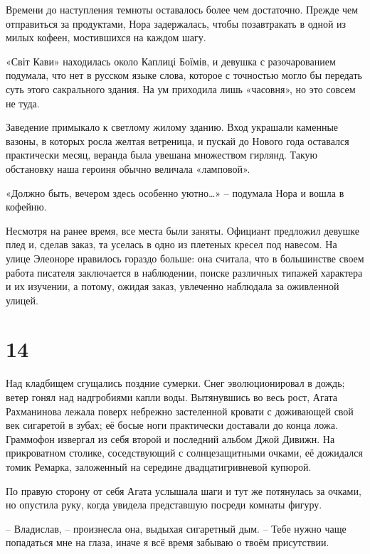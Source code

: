\documentclass[
  a5paperpaper,
  DIV=11,
  numbers=noendperiod]{scrreprt}
\begin{document}
Времени до наступления темноты оставалось более чем достаточно. Прежде
чем отправиться за продуктами, Нора задержалась, чтобы позавтракать в
одной из милых кофеен, мостившихся на каждом шагу.

«Світ Кави» находилась около Каплиці Боїмів, и девушка с разочарованием
подумала, что нет в русском языке слова, которое с точностью могло бы
передать суть этого сакрального здания. На ум приходила лишь «часовня»,
но это совсем не туда.

Заведение примыкало к светлому жилому зданию. Вход украшали каменные
вазоны, в которых росла желтая ветреница, и пускай до Нового года
оставался практически месяц, веранда была увешана множеством гирлянд.
Такую обстановку наша героиня обычно величала «ламповой».

«Должно быть, вечером здесь особенно уютно\ldots» -- подумала Нора и
вошла в кофейню.

Несмотря на ранее время, все места были заняты. Официант предложил
девушке плед и, сделав заказ, та уселась в одно из плетеных кресел под
навесом. На улице Элеоноре нравилось гораздо больше: она считала, что в
большинстве своем работа писателя заключается в наблюдении, поиске
различных типажей характера и их изучении, а потому, ожидая заказ,
увлеченно наблюдала за оживленной улицей.

\section*{14}\label{14}


Над кладбищем сгущались поздние сумерки. Снег эволюционировал в дождь;
ветер гонял над надгробиями капли воды. Вытянувшись во весь рост, Агата
Рахманинова лежала поверх небрежно застеленной кровати с доживающей свой
век сигаретой в зубах; её босые ноги практически доставали до конца
ложа. Граммофон извергал из себя второй и последний альбом Джой Дивижн.
На прикроватном столике, соседствующий с солнцезащитными очками, её
дожидался томик Ремарка, заложенный на середине двадцатигривневой
купюрой.

По правую сторону от себя Агата услышала шаги и тут же потянулась за
очками, но опустила руку, когда увидела представшую посреди комнаты
фигуру.

-- Владислав, -- произнесла она, выдыхая сигаретный дым. -- Тебе нужно
чаще попадаться мне на глаза, иначе я всё время забываю о твоём
присутствии.
\end{document}
